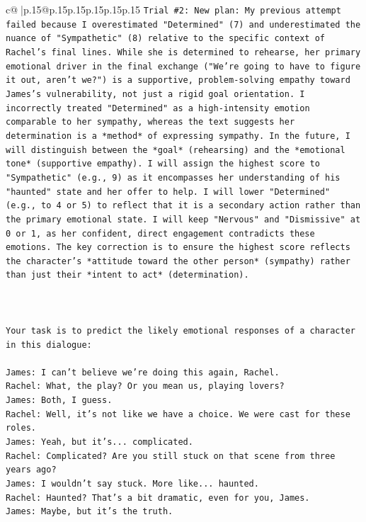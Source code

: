 \documentclass{article}
\begin{document}
{\begin{supertabular}{c@{$\;$}|p{.15\linewidth}@{}p{.15\linewidth}p{.15\linewidth}p{.15\linewidth}p{.15\linewidth}p{.15\linewidth}}
{{{\texttt{Trial \#2: New plan: My previous attempt failed because I overestimated "Determined" (7) and underestimated the nuance of "Sympathetic" (8) relative to the specific context of Rachel's final lines. While she is determined to rehearse, her primary emotional driver in the final exchange ("We're going to have to figure it out, aren't we?") is a supportive, problem{-}solving empathy toward James's vulnerability, not just a rigid goal orientation. I incorrectly treated "Determined" as a high{-}intensity emotion comparable to her sympathy, whereas the text suggests her determination is a *method* of expressing sympathy. In the future, I will distinguish between the *goal* (rehearsing) and the *emotional tone* (supportive empathy). I will assign the highest score to "Sympathetic" (e.g., 9) as it encompasses her understanding of his "haunted" state and her offer to help. I will lower "Determined" (e.g., to 4 or 5) to reflect that it is a secondary action rather than the primary emotional state. I will keep "Nervous" and "Dismissive" at 0 or 1, as her confident, direct engagement contradicts these emotions. The key correction is to ensure the highest score reflects the character's *attitude toward the other person* (sympathy) rather than just their *intent to act* (determination).} \\
\\ 
\\ 
\\ 
\texttt{Your task is to predict the likely emotional responses of a character in this dialogue:} \\
\\ 
\texttt{James: I can't believe we're doing this again, Rachel. } \\
\texttt{Rachel: What, the play? Or you mean us, playing lovers?} \\
\texttt{James: Both, I guess. } \\
\texttt{Rachel: Well, it's not like we have a choice. We were cast for these roles. } \\
\texttt{James: Yeah, but it's... complicated.} \\
\texttt{Rachel: Complicated? Are you still stuck on that scene from three years ago?} \\
\texttt{James: I wouldn't say stuck. More like... haunted.} \\
\texttt{Rachel: Haunted? That's a bit dramatic, even for you, James.} \\
\texttt{James: Maybe, but it's the truth.} \\
}}}
\end{supertabular}}
\end{document}
